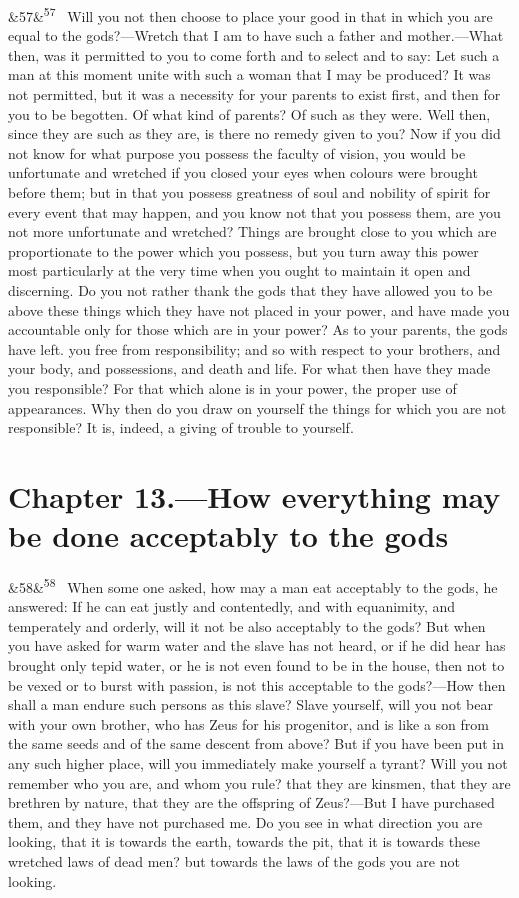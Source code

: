 \documentclass[12pt]{article}
\newcommand{\para}[1][]{\par\noindent\ifx&#1&\else\textsuperscript{\footnotesize #1}~\fi}
\begin{document}
\para[57] Will you not then choose to place your good in that in which you are equal to the gods?—Wretch that I am to have such a father and mother.—What then, was it permitted to you to come forth and to select and to say: Let such a man at this moment unite with such a woman that I may be produced? It was not permitted, but it was a necessity for your parents to exist first, and then for you to be begotten. Of what kind of parents? Of such as they were. Well then, since they are such as they are, is there no remedy given to you? Now if you did not know for what purpose you possess the faculty of vision, you would be unfortunate and wretched if you closed your eyes when colours were brought before them; but in that you possess greatness of soul and nobility of spirit for every event that may happen, and you know not that you possess them, are you not more unfortunate and wretched? Things are brought close to you which are proportionate to the power which you possess, but you turn away this power most particularly at the very time when you ought to maintain it open and discerning. Do you not rather thank the gods that they have allowed you to be above these things which they have not placed in your power, and have made you accountable only for those which are in your power? As to your parents, the gods have left. you free from responsibility; and so with respect to your brothers, and your body, and possessions, and death and life. For what then have they made you responsible? For that which alone is in your power, the proper use of appearances. Why then do you draw on yourself the things for which you are not responsible? It is, indeed, a giving of trouble to yourself.

\section*{Chapter 13.---How everything may be done acceptably to the gods}

\para[58] When some one asked, how may a man eat acceptably to the gods, he answered: If he can eat justly and contentedly, and with equanimity, and temperately and orderly, will it not be also acceptably to the gods? But when you have asked for warm water and the slave has not heard, or if he did hear has brought only tepid water, or he is not even found to be in the house, then not to be vexed or to burst with passion, is not this acceptable to the gods?—How then shall a man endure such persons as this slave? Slave yourself, will you not bear with your own brother, who has Zeus for his progenitor, and is like a son from the same seeds and of the same descent from above? But if you have been put in any such higher place, will you immediately make yourself a tyrant? Will you not remember who you are, and whom you rule? that they are kinsmen, that they are brethren by nature, that they are the offspring of Zeus?—But I have purchased them, and they have not purchased me. Do you see in what direction you are looking, that it is towards the earth, towards the pit, that it is towards these wretched laws of dead men? but towards the laws of the gods you are not looking.
\end{document}

